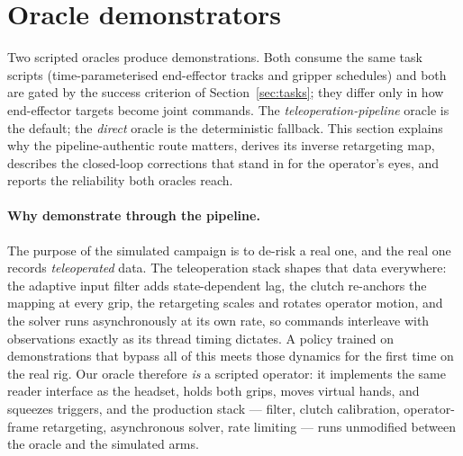 \section{Oracle demonstrators}
\label{sec:oracles}

Two scripted oracles produce demonstrations. Both consume the same task
scripts (time-parameterised end-effector tracks and gripper schedules)
and both are gated by the success criterion of Section~\ref{sec:tasks};
they differ only in how end-effector targets become joint commands. The
\emph{teleoperation-pipeline} oracle is the default; the \emph{direct}
oracle is the deterministic fallback. This section explains why the
pipeline-authentic route matters, derives its inverse retargeting map,
describes the closed-loop corrections that stand in for the operator's
eyes, and reports the reliability both oracles reach.

\paragraph{Why demonstrate through the pipeline.}
The purpose of the simulated campaign is to de-risk a real one, and the
real one records \emph{teleoperated} data. The teleoperation stack
shapes that data everywhere: the adaptive input filter adds
state-dependent lag, the clutch re-anchors the mapping at every grip,
the retargeting scales and rotates operator motion, and the solver runs
asynchronously at its own rate, so commands interleave with observations
exactly as its thread timing dictates. A policy trained on
demonstrations that bypass all of this meets those dynamics for the
first time on the real rig. Our oracle therefore \emph{is} a scripted
operator: it implements the same reader interface as the headset,
holds both grips, moves virtual hands, and squeezes triggers, and the
production stack --- filter, clutch calibration, operator-frame
retargeting, asynchronous solver, rate limiting --- runs unmodified
between the oracle and the simulated arms.

